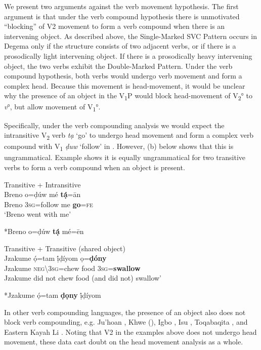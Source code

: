 \documentclass[output=paper]{langsci/langscibook}
\begin{document}
We present two arguments against the verb movement hypothesis. The first argument is that under the verb compound hypothesis there is unmotivated “blocking” of V2 movement to form a verb compound when there is an intervening object. As described above, the Single-Marked SVC Pattern occurs in Degema only if the structure consists of two adjacent verbs, or if there is a prosodically light intervening object. If there is a prosodically heavy intervening object, the two verbs exhibit the Double-Marked Pattern. Under the verb compound hypothesis, both verbs would undergo verb movement and form a complex head. Because this movement is head-movement, it would be unclear why the presence of an object in the V\textsubscript{1}P would block head-movement of V\textsubscript{2}° to \textit{v}°, but allow movement of V\textsubscript{1}°.

Specifically, under the verb compounding analysis we would expect the intransitive V\textsubscript{2} verb \textit{tạ} ‘go’ to undergo head movement and form a complex verb compound with V\textsubscript{1} \textit{ḍuw} ‘follow’ in . However, (b) below shows that this is ungrammatical. Example  shows it is equally ungrammatical for two transitive verbs to form a verb compound when an object is present. 

\ea
{Transitive + Intransitive}\\
\gll   Breno   o=ḍúw    mé   \textbf{tạ́}=ān\\
     Breno   3\textsc{sg}=follow   me   \textbf{go}=\textsc{fe}\\
\glt ‘Breno went with me’ \citep[115]{Kari2004}
\z




\ea
  *Breno o=ḍúw  \textbf{tạ́}  mé=ēn\\
\z

\ea
{Transitive + Transitive (shared object)}\\
\gll   Jzakume   ọ́=tam      ị́ḍíyom  ọ=\textbf{ḍóny}\\
     Jzakume  \textsc{neg{\textbackslash}}3\textsc{sg}=chew  food  3\textsc{sg}=\textbf{swallow}\\
\glt Jzakume did not chew food (and did not) swallow’ \citep[110]{Kari2004}
\z




\ea
   *Jzakume  ọ́=tam  \textbf{ḍọny}  ị́ḍíyom\\
\z


In other verb compounding languages, the presence of an object also does not block verb compounding, e.g. Ju{\textbar}’hoan \citep{Collins2002}, Khwe (\citealt{KilianHatz2006}), Igbo \citep{Lord1975}, Isu \citep{Kießling 2011}, Toqabaqita \citep{Lichtenberk2006,Lichtenberk2008}, and Eastern Kayah Li \citep{Solnit2006}. Noting that V2 in the examples above does not undergo head movement, these data cast doubt on the head movement analysis as a whole.
\end{document}
